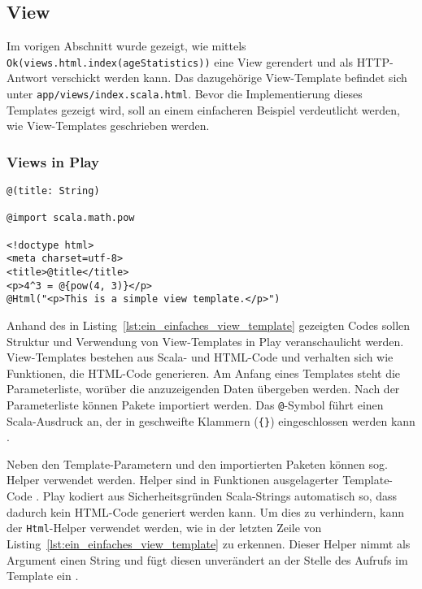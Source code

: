 

\subsection{View} %
\label{sub:view}

Im vorigen Abschnitt wurde gezeigt, wie mittels \lstinline|Ok(views.html.index(ageStatistics))| eine View gerendert und als HTTP-Antwort verschickt werden kann.
Das dazugehörige View-Template befindet sich unter \lstinline|app/views/index.scala.html|.
Bevor die Implementierung dieses Templates gezeigt wird, soll an einem einfacheren Beispiel verdeutlicht werden, wie View-Templates geschrieben werden.

\subsubsection{Views in Play} %
\label{ssub:views_in_play}

\begin{lstlisting}[caption=Ein einfaches View-Template, label=lst:ein_einfaches_view_template]
@(title: String)

@import scala.math.pow

<!doctype html>
<meta charset=utf-8>
<title>@title</title>
<p>4^3 = @{pow(4, 3)}</p>
@Html("<p>This is a simple view template.</p>")
\end{lstlisting}

Anhand des in Listing~\ref{lst:ein_einfaches_view_template} gezeigten Codes sollen Struktur und Verwendung von View-Templates in Play veranschaulicht werden.
View-Templates bestehen aus Scala- und HTML-Code und verhalten sich wie Funktionen, die HTML-Code generieren.
Am Anfang eines Templates steht die Parameterliste, worüber die anzuzeigenden Daten übergeben werden.
Nach der Parameterliste können Pakete importiert werden.
Das \lstinline|@|-Symbol führt einen Scala-Ausdruck an, der in geschweifte Klammern (\lstinline|{}|) eingeschlossen werden kann \cite[vgl.][]{play_templates}.

Neben den Template-Parametern und den importierten Paketen können sog. Helper verwendet werden.
Helper sind in Funktionen ausgelagerter Template-Code \cite[vgl.][S.~227]{play_for_scala_v8}.
Play kodiert aus Sicherheitsgründen Scala-Strings automatisch so, dass dadurch kein HTML-Code generiert werden kann.
Um dies zu verhindern, kann der \lstinline|Html|-Helper verwendet werden, wie in der letzten Zeile von Listing~\ref{lst:ein_einfaches_view_template} zu erkennen.
Dieser Helper nimmt als Argument einen String und fügt diesen unverändert an der Stelle des Aufrufs im Template ein \cite[vgl.][]{play_templates}.

